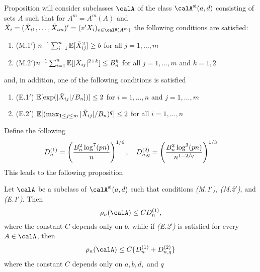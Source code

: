 Proposition will consider subclasses $\calA$ of the class $\calA^{\text{si}}(a,d)$ consisting of sets $A$ such that for $A^m = A^m(A)$ and $\tilde{X}_i = (\tilde{X}_{i1}, \dots, \tilde{X}_{im})' = (v'X_i)_{v\in\calV(A^m)}$ the following conditions are satisfied: 
\begin{enumerate}
	\item (M.1$'$) \(n^{-1}\sum_{i=1}^n \mathbb{E}[\tilde{X}_{ij}^2]\geq b\) for all $j = 1, \dots, m$
	\item (M.2$'$)\(n^{-1}\sum_{i=1}^n \mathbb{E}[|\tilde{X}_{ij}|^{2+k}]\leq B_n^k\) for all $j = 1, \dots, m$ and $k = 1,2$
\end{enumerate}
and, in addition, one of the following conditions is satisfied 
\begin{enumerate}
	\item (E.1$'$) \(\mathbb{E}[\exp(|\tilde{X}_{ij}|/B_n])]\leq 2 \) for $i = 1, \dots, n$ and $j = 1, \dots, m$
	\item (E.2$'$) \(\mathbb{E}[(\max_{1\leq j \leq m} |\tilde{X}_{ij}|/B_n)^q]\leq 2\) for all $i = 1,\dots, n$
\end{enumerate}
Define the following
\begin{equation}
	\label{eq:cck17-9}
	D_n^{(1)} = \left(\frac{B_n^2 \log^7 (pn)}{n}\right)^{1/6}, \hbox{ }\hbox{ }\hbox{ }D_{n,q}^{(2)} = \left(
	\frac{B_n^2 \log^3(pn)}{n^{1-2/q}}\right)^{1/3}
\end{equation}
This leads to the following proposition 
\begin{prop}
	Let $\calA$ be a subclass of $\calA^{\text{si}}(a,d)$ such that conditions \emph{(M.1$'$), (M.2$'$)}, and \emph{(E.1$'$)}. Then 
	\begin{equation}
		\label{eq:cck17-10}
		\rho_n(\calA) \leq C D_n^{(1)},
	\end{equation}
	where the constant $C$ depends only on $b$, while if \emph{(E.2$'$)} is satisfied for every $A\in\calA$, then
	\begin{equation}
		\label{eq:cck17-11}
		\rho_n(\calA) \leq C\{D_n^{(1)} + D_{n,q}^{(2)}\}
	\end{equation}
	where the constant $C$ depends only on $a,b,d,$ and $q$
\end{prop}

